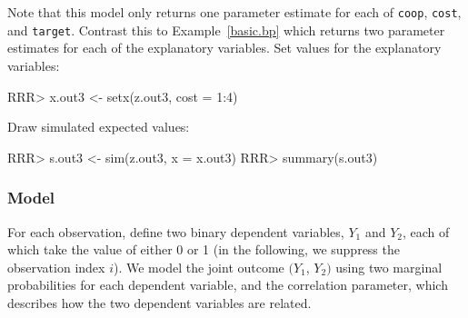 \begin{enumerate}
Note that this model only returns one parameter estimate for each of
{\tt coop}, {\tt cost}, and {\tt target}.  Contrast this to
Example~\ref{basic.bp} which returns two parameter estimates for each
of the explanatory variables.  \newline \newline Set values for the
explanatory variables:
\begin{Schunk}
\begin{Sinput}
RRR>  x.out3 <- setx(z.out3, cost = 1:4)
\end{Sinput}
\end{Schunk}
Draw simulated expected values:  
\begin{Schunk}
\begin{Sinput}
RRR>  s.out3 <- sim(z.out3, x = x.out3)
RRR>  summary(s.out3)
\end{Sinput}
\end{Schunk}

\end{enumerate}

\subsubsection{Model}

For each observation, define two binary dependent variables, $Y_1$ and
$Y_2$, each of which take the value of either 0 or 1 (in the
following, we suppress the observation index $i$).  We model the joint
outcome $(Y_1$, $Y_2)$ using two marginal probabilities for each
dependent variable, and the correlation parameter, which describes how
the two dependent variables are related. 

